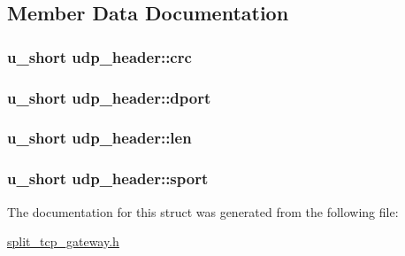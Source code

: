 \subsection{\-Member \-Data \-Documentation}
\hypertarget{structudp__header_a6b117ab2c9d726d4d97defddc3fd1628}{
\subsubsection[{crc}]{\setlength{\rightskip}{0pt plus 5cm}u\-\_\-short {\bf udp\-\_\-header\-::crc}}}\label{structudp__header_a6b117ab2c9d726d4d97defddc3fd1628}
\hypertarget{structudp__header_a2d40aa44f4eeb0f3a94989955cd598f6}{
\subsubsection[{dport}]{\setlength{\rightskip}{0pt plus 5cm}u\-\_\-short {\bf udp\-\_\-header\-::dport}}}\label{structudp__header_a2d40aa44f4eeb0f3a94989955cd598f6}
\hypertarget{structudp__header_aa0903b2195dab412d2f703a4d630ec7f}{
\subsubsection[{len}]{\setlength{\rightskip}{0pt plus 5cm}u\-\_\-short {\bf udp\-\_\-header\-::len}}}\label{structudp__header_aa0903b2195dab412d2f703a4d630ec7f}
\hypertarget{structudp__header_a71c74d82739ecf97039e4e29b574f48c}{
\subsubsection[{sport}]{\setlength{\rightskip}{0pt plus 5cm}u\-\_\-short {\bf udp\-\_\-header\-::sport}}}\label{structudp__header_a71c74d82739ecf97039e4e29b574f48c}


\-The documentation for this struct was generated from the following file\-:\begin{DoxyCompactItemize}
\item 
\hyperlink{split__tcp__gateway_8h}{split\-\_\-tcp\-\_\-gateway.\-h}\end{DoxyCompactItemize}
